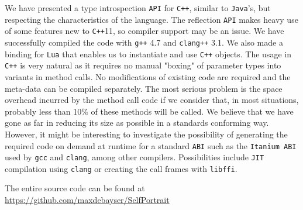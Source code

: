 We have presented a type introspection \texttt{API} for \texttt{C++}, similar to \texttt{Java}'s, but respecting the characteristics of the language.
The reflection \texttt{API} makes heavy use of some features new to \texttt{C++}11, so compiler support may be an issue. We have successfully
compiled the code with \texttt{g++} 4.7 and \texttt{clang++} 3.1.
We also made a binding for \texttt{Lua} that enables us to instantiate and use \texttt{C++} objects.
The usage in \texttt{C++} is very natural as it requires no manual "boxing" of parameter types into variants in method calls.
No modifications of existing code are required and the meta-data can be compiled separately.
The most serious problem is the space overhead incurred by the method call code if we consider that, in most situations,
probably less than 10\% of these methods will be called. We believe that we have gone as far in reducing its size as possible
in a standards conforming way. However, it might be interesting to investigate the possibility of generating the required
code on demand at runtime for a standard \texttt{ABI} such as the \texttt{Itanium ABI} used by \texttt{gcc} and \texttt{clang}, among other compilers.
Possibilities include \texttt{JIT} compilation using \texttt{clang} or creating the call frames with \texttt{libffi}.

The entire source code can be found at \url{https://github.com/maxdebayser/SelfPortrait}